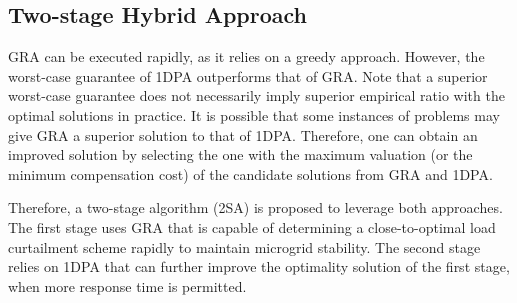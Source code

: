 
\vspace{-5pt} 
\subsection{Two-stage Hybrid Approach}

{\sc GRA} can be executed rapidly, as it relies on a greedy approach. However, the worst-case guarantee of {\sc 1DPA} outperforms that of {\sc GRA}. Note that a superior worst-case guarantee does not necessarily imply superior empirical ratio with the optimal solutions in practice. It is possible that some instances of problems may give {\sc GRA} a superior solution to that of {\sc 1DPA}. Therefore, one can obtain an improved solution by selecting the one with the maximum valuation (or the minimum compensation cost) of the candidate solutions from {\sc GRA} and {\sc 1DPA}.

Therefore, a two-stage algorithm ({\sc 2SA}) is proposed to leverage both approaches. The first stage uses {\sc GRA} that is capable of determining a close-to-optimal load curtailment scheme rapidly to maintain microgrid stability. The second stage relies on {\sc 1DPA} that can further improve the optimality solution of the first stage, when more response time is permitted. 